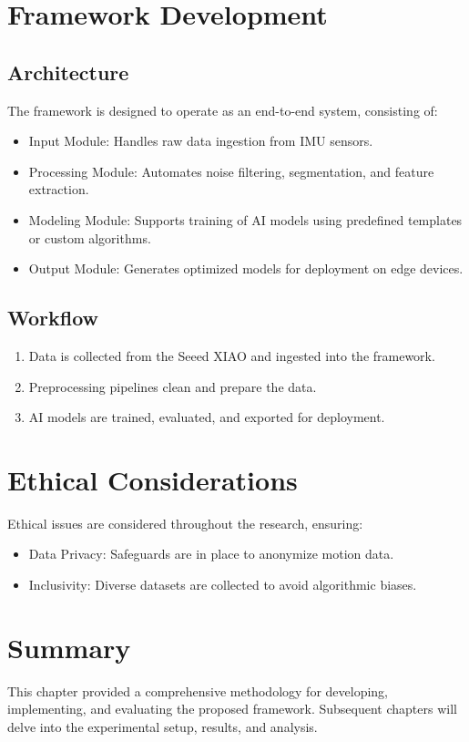 \section{Framework Development}
\subsection{Architecture}
The framework is designed to operate as an end-to-end system, consisting of:
\begin{itemize}
    \item Input Module:
    Handles raw data ingestion from IMU sensors.
    \item Processing Module:
    Automates noise filtering, segmentation, and feature extraction.
    \item Modeling Module:
    Supports training of AI models using predefined templates or custom algorithms.
    \item Output Module:
    Generates optimized models for deployment on edge devices.
\end{itemize}
\subsection{Workflow}
\begin{enumerate}
    \item Data is collected from the Seeed XIAO and ingested into the framework.
    \item Preprocessing pipelines clean and prepare the data.
    \item AI models are trained, evaluated, and exported for deployment.
\end{enumerate}

\section{Ethical Considerations}
Ethical issues are considered throughout the research, ensuring:

\begin{itemize}
    \item Data Privacy: Safeguards are in place to anonymize motion data.
    \item Inclusivity: Diverse datasets are collected to avoid algorithmic biases.
\end{itemize}
\section{Summary}
This chapter provided a comprehensive methodology for developing, implementing, and evaluating the proposed framework. Subsequent chapters will delve into the experimental setup, results, and analysis.